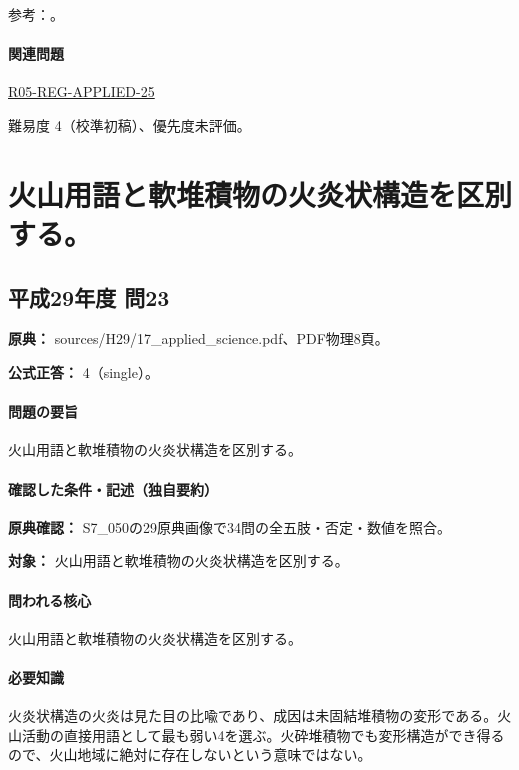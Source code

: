 \par 参考：\cite{vol50_melt_ref,vol50_subduction_ref}。

\paragraph{関連問題} \hyperref[q:r05-reg-applied-25]{R05-REG-APPLIED-25}

\par 難易度 4（校準初稿）、優先度未評価。

\section{火山用語と軟堆積物の火炎状構造を区別する。}

\subsection{平成29年度 問23}
\label{q:h29-reg-applied-23}

\noindent\textbf{原典：} sources/H29/17\_applied\_science.pdf、PDF物理8頁。

\textbf{公式正答：} 4（single）。

\paragraph{問題の要旨} 火山用語と軟堆積物の火炎状構造を区別する。

\paragraph{確認した条件・記述（独自要約）}\mbox{}\par

\noindent\textbf{原典確認：} S7\_050の29原典画像で34問の全五肢・否定・数値を照合。\par

\noindent\textbf{対象：} 火山用語と軟堆積物の火炎状構造を区別する。\par

\paragraph{問われる核心} 火山用語と軟堆積物の火炎状構造を区別する。

\paragraph{必要知識} 火炎状構造の火炎は見た目の比喩であり、成因は未固結堆積物の変形である。火山活動の直接用語として最も弱い4を選ぶ。火砕堆積物でも変形構造ができ得るので、火山地域に絶対に存在しないという意味ではない。

